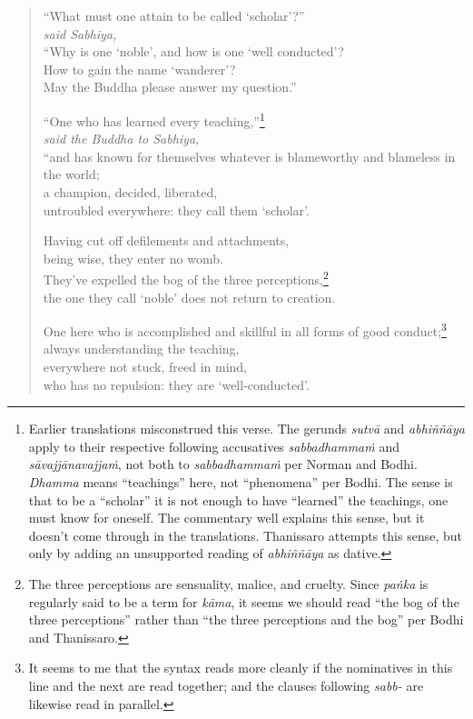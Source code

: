 \documentclass[12pt,openany]{book}%
\newcommand*{\scspeaker}[1]{\hspace{2em}\textit{#1}}
\begin{document}
\begin{verse}%
“What must one attain to be called ‘scholar’?” \\
\scspeaker{said Sabhiya, }\\
“Why is one ‘noble’, and how is one ‘well conducted’? \\
How to gain the name ‘wanderer’? \\
May the Buddha please answer my question.” 

“One who has learned every teaching,”\footnote{Earlier translations misconstrued this verse. The gerunds \textit{\textsanskrit{sutvā}} and \textit{\textsanskrit{abhiññāya}} apply to their respective following accusatives \textit{\textsanskrit{sabbadhammaṁ}} and \textit{\textsanskrit{sāvajjānavajjaṁ}}, not both to \textit{\textsanskrit{sabbadhammaṁ}} per Norman and Bodhi. \textit{Dhamma} means “teachings” here, not “phenomena” per Bodhi. The sense is that to be a “scholar” it is not enough to have “learned” the teachings, one must know for oneself. The commentary well explains this sense, but it doesn’t come through in the translations. Thanissaro attempts this sense, but only by adding an unsupported reading of \textit{\textsanskrit{abhiññāya}} as dative. } \\
\scspeaker{said the Buddha to Sabhiya, }\\
“and has known for themselves whatever is blameworthy and blameless in the world; \\
a champion, decided, liberated, \\
untroubled everywhere: they call them ‘scholar’. 

Having cut off defilements and attachments, \\
being wise, they enter no womb. \\
They’ve expelled the bog of the three perceptions,\footnote{The three perceptions are sensuality, malice, and cruelty. Since \textit{\textsanskrit{paṅka}} is regularly said to be a term for \textit{\textsanskrit{kāma}}, it seems we should read “the bog of the three perceptions” rather than “the three perceptions and the bog” per Bodhi and Thanissaro. } \\
the one they call ‘noble’ does not return to creation. 

One here who is accomplished and skillful in all forms of good conduct;\footnote{It seems to me that the syntax reads more cleanly if the nominatives in this line and the next are read together; and the clauses following \textit{sabb-} are likewise read in parallel. } \\
always understanding the teaching, \\
everywhere not stuck, freed in mind, \\
who has no repulsion: they are ‘well-conducted’. 


\end{verse}
\end{document}

